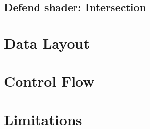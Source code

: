 \subsection{Defend shader: Intersection}

\section{Data Layout}

\section{Control Flow}

\section{Limitations}
